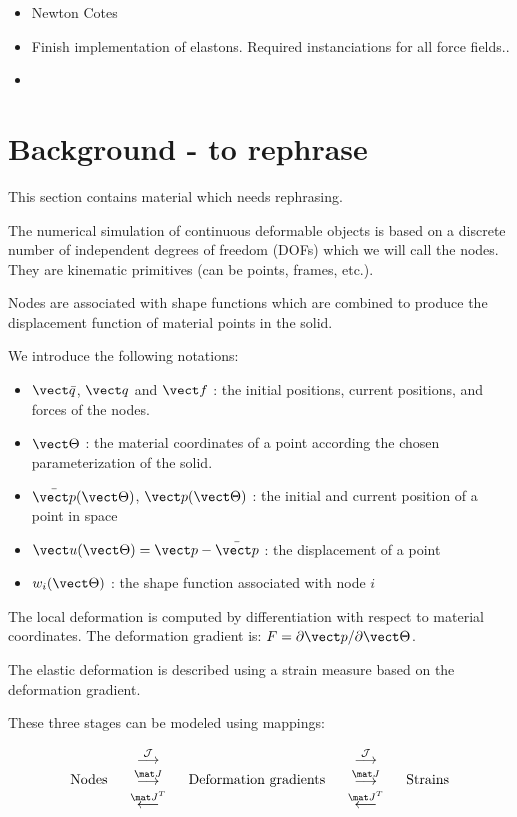 \begin{itemize}
 \item Newton Cotes
 \item Finish implementation of elastons. Required instanciations for all force fields..
 \item 
\end{itemize}

\appendix

\section{Background - to rephrase}
This section contains material which needs rephrasing.

The numerical simulation of continuous deformable objects is based on a discrete number of independent degrees of freedom (DOFs) which we will call the nodes. They are kinematic primitives (can be points, frames, etc.).

Nodes are associated with shape functions which are combined to produce the displacement function of material points in the solid.

We introduce the following notations:
\begin{itemize}
 \item $\vdofinit$, $\vdof$ and $\fdof$ : the initial positions, current positions, and forces of the nodes.
 \item $\mCoord$ : the material coordinates of a point according the chosen parameterization of the solid.
 \item $\pinit(\mCoord)$, $\p (\mCoord)$ : the initial and current position of a point in space
 \item $\disp (\mCoord) =\p-\pinit$ : the displacement of a point
 \item $\shapef_i(\mCoord)$ : the shape function associated with node $i$
\end{itemize}

The local deformation is computed by differentiation with respect to material coordinates. The deformation gradient is: $\defograd = \partial \p / \partial \mCoord$.

The elastic deformation is described using a strain measure based on the deformation gradient. 

These three stages can be modeled using \sofa{} mappings:

\begin{equation}
\left. \begin{array}{ccccc}
\mbox{Nodes}  & \MappingArrows &   \mbox{Deformation gradients} & \MappingArrows &  \mbox{Strains}
\end{array}\right. 
\end{equation}

